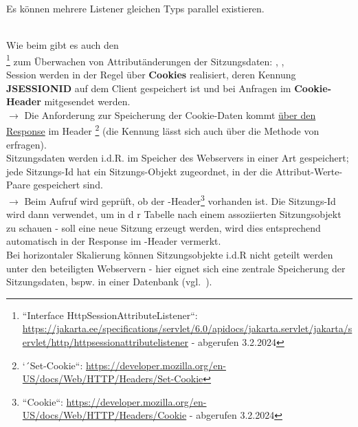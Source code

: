 \begin{tcolorbox}[enlarge top by=0.5cm,enlarge bottom by=0.5cm]
Es können mehrere Listener gleichen Typs parallel existieren.
\end{tcolorbox}\\

\noindent
Wie beim   gibt es auch den\\ \footnote{``Interface HttpSessionAttributeListener``: \url{https://jakarta.ee/specifications/servlet/6.0/apidocs/jakarta.servlet/jakarta/servlet/http/httpsessionattributelistener} - abgerufen 3.2.2024
} zum Überwachen von Attributänderungen der Sitzungsdaten: , , \\

\noindent
Session werden in der Regel über \textbf{Cookies} realisiert, deren Kennung\\ \textbf{JSESSIONID} auf dem Client gespeichert ist und bei Anfragen im \textbf{Cookie-Header} mitgesendet werden.\\
$\rightarrow$ Die Anforderung zur Speicherung der Cookie-Daten kommt \ul{über den Response} im Header \footnote{
    `´Set-Cookie``: \url{https://developer.mozilla.org/en-US/docs/Web/HTTP/Headers/Set-Cookie}
} (die Kennung lässt sich auch über die Methode  von  erfragen).\\

\noindent
Sitzungsdaten werden i.d.R. im Speicher des Webservers in einer Art  gespeichert; jede Sitzungs-Id hat ein Sitzungs-Objekt zugeordnet, in der die Attribut-Werte-Paare gespeichert sind.\\

$\rightarrow$ Beim Aufruf  wird geprüft, ob der -Header\footnote{
    ``Cookie``: \url{https://developer.mozilla.org/en-US/docs/Web/HTTP/Headers/Cookie} - abgerufen 3.2.2024
} vorhanden ist.
Die Sitzungs-Id wird dann verwendet, um in d r Tabelle nach einem assoziierten Sitzungsobjekt zu schauen - soll eine neue Sitzung erzeugt werden, wird dies entsprechend automatisch in der Response im -Header vermerkt.\\

\noindent
Bei horizontaler Skalierung können Sitzungsobjekte i.d.R nicht geteilt werden unter den beteiligten Webservern - hier eignet sich eine zentrale Speicherung der Sitzungsdaten, bspw. in einer Datenbank (vgl.~\cite[433]{Oec22}).

